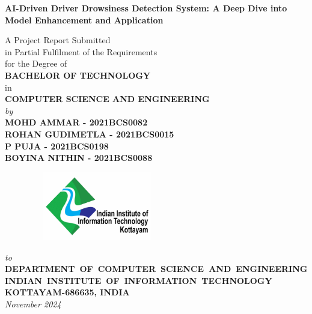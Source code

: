 \documentclass[12pt,a4wide]{report}
\theoremstyle{plain}
\theoremstyle{definition}
\theoremstyle{remark}
\begin{document}

\begin{titlepage}
\enlargethispage{5cm}

\begin{center}

\vspace*{-1cm}

\textbf{\Large AI-Driven Driver Drowsiness Detection System: A Deep Dive into Model Enhancement and Application}\\[10pt]

\vspace*{2 cm}


            
A Project Report Submitted \\
in Partial Fulfilment of the Requirements  \\
for the Degree of  \\
     \vspace{4.5mm}
{\Large \bf BACHELOR OF TECHNOLOGY } \\
in \\
{\large \bf COMPUTER SCIENCE AND ENGINEERING } \\

 \vspace{9mm}
{\em  by} \\ \vspace{2.5mm}
             {\large \bf MOHD AMMAR - 2021BCS0082 } \\ 
             {\large \bf ROHAN GUDIMETLA - 2021BCS0015 } \\ 
             {\large \bf P PUJA - 2021BCS0198 } \\ 
             {\large \bf BOYINA NITHIN - 2021BCS0088 } \\

\vfill

\begin{figure}[h]
  \begin{center}
  \includegraphics[width=6cm, height=3cm]{logo2.jpg}
  \end{center}
\end{figure}
\vspace*{0.2cm}
{\em\large to }\\%
{\bf \mbox{DEPARTMENT OF COMPUTER SCIENCE AND ENGINEERING}} \\%
{\bf \mbox{INDIAN INSTITUTE OF INFORMATION TECHNOLOGY}}\\%
{\bf KOTTAYAM-686635, INDIA}\\%
{\it November 2024}

\end{center}

\end{titlepage}
\end{document}
